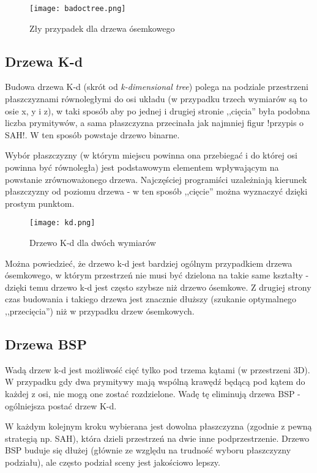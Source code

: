\begin{figure}[h!]
\centering
  \caption{Zły przypadek dla drzewa ósemkowego}
  \texttt{[image: badoctree.png]}
\end{figure}

\subsection{Drzewa K-d}

Budowa drzewa K-d (skrót od \emph{k-dimensional tree}) polega na podziale przestrzeni płaszczyznami równoległymi do osi układu (w przypadku trzech wymiarów są to osie x, y i z), w taki sposób aby po jednej i drugiej stronie ,,cięcia'' była podobna liczba prymitywów, a sama płaszczyzna przecinała jak najmniej figur !przypis o SAH!. W ten sposób powstaje drzewo binarne.

Wybór płaszczyzny (w którym miejscu powinna ona przebiegać i do której osi powinna być równoległa) jest podstawowym elementem wpływającym na powstanie zrównoważonego drzewa. Najczęściej programiści uzależniają kierunek płaszczyzny od poziomu drzewa - w ten sposób ,,cięcie'' można wyznaczyć dzięki prostym punktom.

\begin{figure}[h!]
\centering
  \caption{Drzewo K-d dla dwóch wymiarów}
  \texttt{[image: kd.png]}
\end{figure}

Można powiedzieć, że drzewo k-d jest bardziej ogólnym przypadkiem drzewa ósemkowego, w którym przestrzeń nie musi być dzielona na takie same kształty - dzięki temu drzewo k-d jest często szybsze niż drzewo ósemkowe. Z drugiej strony czas budowania i takiego drzewa jest znacznie dłuższy (szukanie optymalnego ,,przecięcia'') niż w przypadku drzew ósemkowych.


\subsection{Drzewa BSP}

Wadą drzew k-d jest możliwość cięć tylko pod trzema kątami (w przestrzeni 3D). W przypadku gdy dwa prymitywy mają wspólną krawędź będącą pod kątem do każdej z osi, nie mogą one zostać rozdzielone. Wadę tę eliminują drzewa BSP - ogólniejsza postać drzew K-d.

W każdym kolejnym kroku wybierana jest dowolna płaszczyzna (zgodnie z pewną strategią np. SAH), która dzieli przestrzeń na dwie inne podprzestrzenie. Drzewo BSP buduje się dłużej (głównie ze względu na trudność wyboru płaszczyzny podziału), ale często podział sceny jest jakościowo lepszy.


